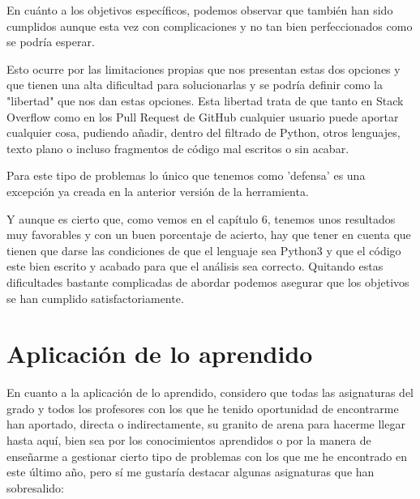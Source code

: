 \documentclass[a4paper, 12pt]{book}
\begin{document}
En cuánto a los objetivos específicos, podemos observar que también han sido cumplidos aunque esta vez con complicaciones y no tan bien perfeccionados como se podría esperar.

Esto ocurre por las limitaciones propias que nos presentan estas dos opciones y que tienen una alta dificultad para solucionarlas y se podría definir como la "libertad" que nos dan estas opciones. Esta libertad trata de que tanto en Stack Overflow como en los Pull Request de GitHub cualquier usuario puede aportar cualquier cosa, pudiendo añadir, dentro del filtrado de Python, otros lenguajes, texto plano o incluso fragmentos de código mal escritos o sin acabar.

Para este tipo de problemas lo único que tenemos como 'defensa' es una excepción ya creada en la anterior versión de la herramienta.

Y aunque es cierto que, como vemos en el capítulo 6, tenemos unos resultados muy favorables y con un buen porcentaje de acierto, hay que tener en cuenta que tienen que darse las condiciones de que el lenguaje sea Python3 y que el código este bien escrito y acabado para que el análisis sea correcto. Quitando estas dificultades bastante complicadas de abordar podemos asegurar que los objetivos se han cumplido satisfactoriamente.

\section{Aplicación de lo aprendido}
\label{sec:aplicacion}

En cuanto a la aplicación de lo aprendido, considero que todas las asignaturas del grado y todos los profesores con los que he tenido oportunidad de encontrarme han aportado, directa o indirectamente, su granito de arena para hacerme llegar hasta aquí, bien sea por los conocimientos aprendidos o por la manera de enseñarme a gestionar cierto tipo de problemas con los que me he encontrado en este último año, pero sí me gustaría destacar algunas asignaturas que han sobresalido:
\end{document}
